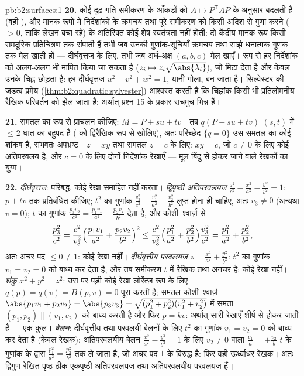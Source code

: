 \begin{solution}{pb:b2:surfaces:1}
\textbf{20.} कोई दृढ़ गति समीकरण के आँकड़ों को $A \mapsto P^{\mathsf T}\!AP$ के अनुसार
बदलती है (वही ), और मानक रूपों में निर्देशांकों के
क्रमचय तथा पूरे समीकरण को किसी अदिश से गुणा करने ($> 0$, ताकि लेखन
बचा रहे) के अतिरिक्त कोई शेष स्वतंत्रता नहीं होती: दो केंद्रीय
मानक रूप किसी समदूरिक प्रतिचित्रण तक संपाती हैं तभी जब उनकी
गुणांक-सूचियाँ क्रमचय तथा साझे धनात्मक गुणक तक मेल खाती हों ---
दीर्घवृत्तज के लिए, तभी जब अर्ध-अक्ष $(a, b, c)$ मेल खाएँ।  रूप से हर
निर्देशांक को अलग-अलग भी मापित किया जा सकता है ($z_i \mapsto z_i\sqrt{\abs
{\lambda_i}}$), जो
 मिटा देता है और केवल उनके चिह्न छोड़ता है: हर
दीर्घवृत्तज $u^2 + v^2 + w^2 = 1$, यानी गोला, बन जाता है। सिल्वेस्टर की जड़त्व
प्रमेय (\cref{thm:b2:quadratic:sylvester}) आश्वस्त करती है कि चिह्नांक किसी भी प्रतिलोमनीय
रैखिक परिवर्तन को झेल जाता है: अर्थात् प्रश्न 15 के  प्रकार
सचमुच भिन्न हैं।

\textbf{21.} समतल का  रूप से प्राचलन कीजिए: $M = P + su +
tv$। तब $q(P + su + tv)$ $(s, t)$
में $\leq 2$ घात का बहुपद है ( को द्विरैखिक रूप से खोलिए),
अतः परिच्छेद $\{q = 0\}$ उस समतल का कोई शांकव है, संभवतः अपभ्रष्ट। $z = xy$
तथा समतल $z = c$ के लिए: $xy = c$, जो $c \neq 0$ के लिए कोई अतिपरवलय है, और $c = 0$
के लिए दोनों निर्देशांक रेखाएँ --- मूल बिंदु से होकर जाने वाले
रेखकों का युग्म।

\textbf{22.} \emph{दीर्घवृत्तज}: परिबद्ध, कोई रेखा समाहित नहीं
करता। \emph{द्विपृष्ठी अतिपरवलयज} $\frac{z^2}{c^2} -
\frac{x^2}{a^2} - \frac{y^2}{b^2} = 1$: $p + tv$ तक प्रतिबंधित कीजिए;
$t^2$ का गुणांक $\frac{v_3^2}{c^2} - \frac{v_1^2}{a^2}
- \frac{v_2^2}{b^2}$ लुप्त होना ही चाहिए, अतः $v_3 \neq 0$ (अन्यथा $v =
0$);
$t$ का गुणांक $\frac{p_3v_3}{c^2} =
\frac{p_1v_1}{a^2} + \frac{p_2v_2}{b^2}$ देता है, और कोशी--श्वार्ज़ से
\[
\frac{p_3^2}{c^2}
= \frac{c^2}{v_3^2}\Bigl(\frac{p_1v_1}{a^2} +
\frac{p_2v_2}{b^2}\Bigr)^2
\leq \frac{c^2}{v_3^2}\Bigl(\frac{p_1^2}{a^2} +
\frac{p_2^2}{b^2}\Bigr)\frac{v_3^2}{c^2}
= \frac{p_1^2}{a^2} + \frac{p_2^2}{b^2},
\]
अतः अचर पद $\leq 0 \neq 1$: कोई रेखा नहीं। \emph{दीर्घवृत्तीय परवलयज} $z = \frac{x^2}{a^2} +
\frac{y^2}{b^2}$:
$t^2$ का गुणांक $v_1 = v_2 =
0$ को बाध्य कर देता है, और तब समीकरण $t$ में
रैखिक तथा अनचर है: कोई रेखा नहीं। \emph{शंकु} $x^2 + y^2 = z^2$: उस पर पड़ी
कोई रेखा लोरेंत्ज़ रूप के लिए $q(p) =
q(v) = B(p, v) = 0$ पूरा करती है; समतल
कोशी--श्वार्ज़ $\abs{p_1v_1 + p_2v_2} = \abs{p_3v_3} =
\sqrt{(p_1^2 + p_2^2)(v_1^2 + v_2^2)}$ में समता $(p_1, p_2)
\parallel (v_1, v_2)$ को बाध्य करती है और फिर $p = kv$:
अर्थात् सारी रेखाएँ शीर्ष से होकर जाती हैं --- एक कुल।
\emph{बेलन}: दीर्घवृत्तीय तथा परवलयी बेलनों के लिए $t^2$ का
गुणांक $v_1 = v_2 = 0$ को बाध्य कर देता है (केवल रेखक); अतिपरवलयीय बेलन
$\frac{x^2}{a^2} - \frac{y^2}{b^2} = 1$ के लिए $v_2 \neq 0$ वाला $\frac{v_1}a = \pm
\frac{v_2}b$ $t$ के गुणांक के द्वारा $\frac{p_1^2}{a^2} = \frac{p_2^2}{b^2}$ तक ले
जाता है, जो अचर पद $1$ के विरुद्ध है: फिर वही ऊर्ध्वाधर रेखक।
अतः द्विगुण रेखित  पृष्ठ ठीक एकपृष्ठी अतिपरवलयज तथा
अतिपरवलयीय परवलयज हैं।


\end{solution}
